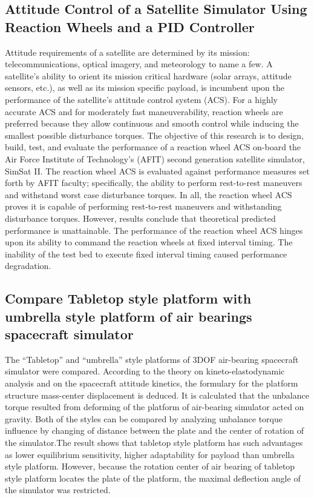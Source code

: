 \subsection{Attitude Control of a Satellite Simulator Using Reaction Wheels and a PID Controller}

Attitude requirements of a satellite are determined by its mission: telecommunications, optical imagery, and meteorology to name a few. A satellite's ability to orient its mission critical hardware (solar arrays, attitude sensors, etc.), as well as its mission specific payload, is incumbent upon the performance of the satellite's attitude control system (ACS). For a highly accurate ACS and for moderately fast maneuverability, reaction wheels are preferred because they allow continuous and smooth control while inducing the smallest possible disturbance torques. The objective of this research is to design, build, test, and evaluate the performance of a reaction wheel ACS on-board the Air Force Institute of Technology's (AFIT) second generation satellite simulator, SimSat II. The reaction wheel ACS is evaluated against performance measures set forth by AFIT faculty; specifically, the ability to perform rest-to-rest maneuvers and withstand worst case disturbance torques. In all, the reaction wheel ACS proves it is capable of performing rest-to-rest maneuvers and withstanding disturbance torques. However, results conclude that theoretical predicted performance is unattainable. The performance of the reaction wheel ACS hinges upon its ability to command the reaction wheels at fixed interval timing. The inability of the test bed to execute fixed interval timing caused performance degradation.

\subsection{Compare Tabletop style platform with umbrella style platform of air bearings spacecraft simulator}

The “Tabletop” and “umbrella” style platforms of 3DOF air-bearing spacecraft simulator were compared. According to the theory on kineto-elastodynamic analysis and on the spacecraft attitude kinetics, the formulary for the platform structure mass-center displacement is deduced. It is calculated that the unbalance torque resulted from deforming of the platform of air-bearing simulator acted on gravity. Both of the styles can be compared by analyzing unbalance torque influence by changing of distance between the plate and the center of rotation of the simulator.The result shows that tabletop style platform has such advantages as lower equilibrium sensitivity, higher adaptability for payload than umbrella style platform. However, because the rotation center of air bearing of tabletop style platform locates the plate of the platform, the maximal deflection angle of the simulator was restricted.

